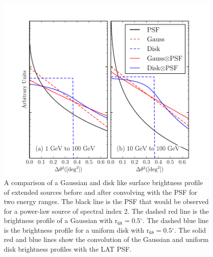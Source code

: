 \documentclass[12pt,preprint]{aastex}
\newcommand{\rsixeight}{{\ensuremath{\text{r}_{68}}}\xspace}
\renewcommand{\deg}{\ensuremath{^\circ}\xspace}
\begin{document}
\begin{figure}
  \begin{center}
    \includegraphics{mc_plots/compare_disk_gauss.pdf}
    \end{center}
    \caption{
    A comparison of a Gaussian and disk like surface brightness profile
    of extended sources before and after convolving with the PSF for two
    energy ranges.  The black line is the PSF that would be observed
    for a power-law source of spectral index 2. The dashed red line
    is the brightness profile of a Gaussian with $\rsixeight=0.5\deg$.
    The dashed blue line is the brightness profile for a uniform disk
    with $\rsixeight=0.5\deg$.  The solid red and blue lines show the
    convolution of the Gaussian and uniform disk brightness profiles
    with the LAT PSF.
    }\label{compare_disk_gauss}
  \end{figure}
\end{document}
